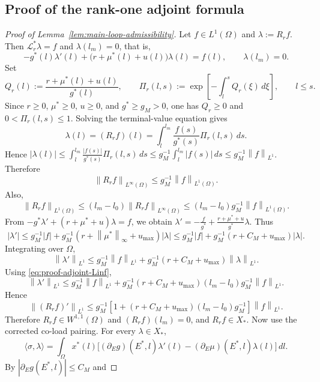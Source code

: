 \documentclass[pdflatex,sn-mathphys-num]{sn-jnl}
\theoremstyle{thmstyleone}
\theoremstyle{definition}
\theoremstyle{remark}
\newcommand{\Om}{\Omega}
\newcommand{\Lcal}{\mathcal{L}}
\newcommand{\norm}[1]{\left\lVert#1\right\rVert}
\newcommand{\abs}[1]{\left\lvert#1\right\rvert}
\numberwithin{equation}{section}
\begin{document}
\subsection{Proof of the rank-one adjoint formula}
\label{subsec:proof-adjoint}
\begin{proof}[Proof of Lemma~\ref{lem:main-loop-admissibility}]
Let
$f\in L^1(\Om)$ and
$\lambda:=R_rf$.
Then
$\Lcal_r^*\lambda=f$ and
$\lambda(l_m)=0$,
that is,
\[
-g^*(l)\lambda'(l)
+
\big(r+\mu^*(l)+u(l)\big)\lambda(l)=f(l),
\qquad
\lambda(l_m)=0 .
\]
Set
\[
Q_r(l):=\frac{r+\mu^*(l)+u(l)}{g^*(l)},
\qquad
\Pi_r(l,s):=
\exp\!\left[
-\int_l^s Q_r(\xi)\,d\xi
\right],
\qquad
l\le s.
\]
Since
$r\ge0$,
$\mu^*\ge0$,
$u\ge0$, and
$g^*\ge g_M>0$,
one has
$Q_r\ge0$ and
$0<\Pi_r(l,s)\le1$.
Solving the terminal-value equation gives
\[
\lambda(l)
=
(R_rf)(l)
=
\int_l^{l_m}
\frac{f(s)}{g^*(s)}
\Pi_r(l,s)\,ds.
\]
Hence
$\displaystyle 
\abs{\lambda(l)}
\le
\int_l^{l_m}
\frac{\abs{f(s)}}{g^*(s)}
\Pi_r(l,s)\,ds
\le
g_M^{-1}\int_l^{l_m}\abs{f(s)}\,ds
\le
g_M^{-1}\norm{f}_{L^1}$.
Therefore
\[
\norm{R_rf}_{L^\infty(\Om)}
\le
g_M^{-1}\norm{f}_{L^1(\Om)}.
\]
Also,
\begin{equation} 
\label{eq:proof-adjoint-Linf}
\norm{R_rf}_{L^1(\Om)}
\le
(l_m-l_0)\norm{R_rf}_{L^\infty(\Om)}
\le
(l_m-l_0)g_M^{-1}\norm{f}_{L^1(\Om)}.
\end{equation}
From
$\displaystyle 
-g^*\lambda'
+
(r+\mu^*+u)\lambda
=f$,
we obtain
$\displaystyle 
\lambda'
=
-\frac{f}{g^*}
+
\frac{r+\mu^*+u}{g^*}\lambda$.
Thus
\[
\abs{\lambda'}
\le
g_M^{-1}\abs{f}
+
g_M^{-1}(r+\norm{\mu^*}_{\infty}+u_{\max})\abs{\lambda}
\le g_M^{-1}\abs{f}
+
g_M^{-1}(r+C_M+u_{\max})\abs{\lambda}.
\]
Integrating over \(\Om\),
\[
\norm{\lambda'}_{L^1}
\le
g_M^{-1}\norm{f}_{L^1}
+
g_M^{-1}(r+C_M+u_{\max})\norm{\lambda}_{L^1}.
\]
Using \eqref{eq:proof-adjoint-Linf},
\[
\norm{\lambda'}_{L^1}
\le
g_M^{-1}\norm{f}_{L^1}
+
g_M^{-1}(r+C_M+u_{\max})(l_m-l_0)g_M^{-1}\norm{f}_{L^1}.
\]
Hence
\begin{equation}
\label{eq:proof-adjoint-W11}
\norm{(R_rf)'}_{L^1}
\le
g_M^{-1}
\left[
1+(r+C_M+u_{\max})(l_m-l_0)g_M^{-1}
\right]\norm{f}_{L^1}.
\end{equation}
Therefore
$R_rf\in W^{1,1}(\Om)$ and $(R_rf)(l_m)=0$, and $R_rf\in X_*$.
Now use the corrected co-load pairing. For every \(\lambda\in X_*\),
\[
\langle\sigma,\lambda\rangle
=
\int_{\Om}x^*(l)
\Big[
(\partial_Eg)(E^*,l)\lambda'(l)
-
(\partial_E\mu)(E^*,l)\lambda(l)
\Big]\,dl .
\]
By
$\abs{\partial_Eg(E^*,l)}\le C_M$ and

\end{proof}
\end{document}
